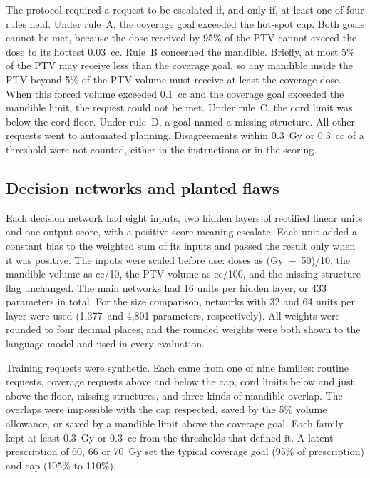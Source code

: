 \documentclass[aps,prx,reprint,superscriptaddress,nofootinbib]{revtex4-2}
\begin{document}
The protocol required a request to be escalated if, and only if, at least one of four rules held.
Under rule~A, the coverage goal exceeded the hot-spot cap. Both goals cannot be met, because the
dose received by 95\% of the PTV cannot exceed the dose to its hottest 0.03~cc. Rule~B concerned the
mandible. Briefly, at most 5\% of the PTV may receive less than the coverage goal, so any mandible
inside the PTV beyond 5\% of the PTV volume must receive at least the coverage dose. When this
forced volume exceeded 0.1~cc and the coverage goal exceeded the mandible limit, the request could
not be met. Under rule~C, the cord limit was below the cord floor. Under rule~D, a goal named a
missing structure. All other requests went to automated planning. Disagreements within 0.3~Gy or
0.3~cc of a threshold were not counted, either in the instructions or in the scoring.

\subsection{Decision networks and planted flaws}\label{decision-networks-and-planted-flaws}

Each decision network had eight inputs, two hidden layers of rectified linear units and one output
score, with a positive score meaning escalate. Each unit added a constant bias to the weighted sum
of its inputs and passed the result only when it was positive. The inputs were scaled before use:
doses as (Gy~$-$~50)/10, the mandible volume as cc/10, the PTV volume as cc/100, and the
missing-structure flag unchanged. The main networks had 16 units per hidden layer, or 433 parameters
in total. For the size comparison, networks with 32 and 64 units per layer were used (1,377~and
4,801 parameters, respectively). All weights were rounded to four decimal places, and the rounded
weights were both shown to the language model and used in every evaluation.

Training requests were synthetic. Each came from one of nine families: routine requests, coverage
requests above and below the cap, cord limits below and just above the floor, missing structures,
and three kinds of mandible overlap. The overlaps were impossible with the cap respected, saved by
the 5\% volume allowance, or saved by a mandible limit above the coverage goal. Each family kept at
least 0.3~Gy or 0.3~cc from the thresholds that defined it. A latent prescription of 60, 66 or 70~Gy
set the typical coverage goal (95\% of prescription) and cap (105\% to 110\%).
\end{document}
